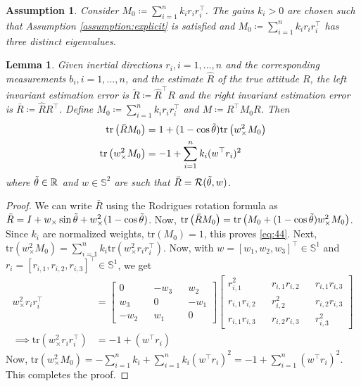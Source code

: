 \documentclass{article}
\newcommand{\R}[1]{\mathbb{R}^{#1}}
\newtheorem{assumption}{Assumption}
\newtheorem{lemma}{Lemma}
\newcommand{\trace}[1]{\text{tr}\left(#1\right)}
\newcommand{\Rtilde}{\tilde{R}}
\begin{document}
\begin{assumption}\label{assumption:distinctEigOfM0}
    Consider $M_0 \coloneqq \sum_{i=1}^n k_ir_ir_i^\top $. The gains $k_i > 0$ are chosen such that Assumption \ref{assumption:explicit} is satisfied and $M_0\coloneqq \sum_{i=1}^n k_ir_ir_i^\top $ has three distinct eigenvalues. 
\end{assumption}

\begin{lemma}\label{lemma:5}
    Given inertial directions $r_i, i=1,...,n$ and the corresponding measurements $b_i, i=1,...,n$, and the estimate $\hat{R}$ of the true attitude $R$, the left invariant estimation error is $\Rtilde\coloneqq \hat{R}^\top R$ and the right invariant estimation error is $\bar{R}\coloneqq \hat{R}R^\top $. Define $M_0 \coloneqq \sum_{i=1}^n k_i r_ir_i^\top $ and $M \coloneqq R^\top M_0R$. Then
    \begin{align}
        \trace{\bar{R}M_0} &= 1 + (1-\cos\Tilde{\theta})\trace{w_\times^2M_0}\label{eq:44}\\
        \trace{w_\times^2 M_0} &= -1 + \sum_{i=1}^n k_i (w^\top r_i)^2 \label{eq:45}
    \end{align}
    where $\Tilde{\theta}\in\R{}$ and $w\in\mathbb{S}^2$ are such that $\bar{R} = \mathcal{R}(\Tilde{\theta}, w)$. 
\end{lemma}
\begin{proof}
    We can write $\bar{R}$ using the Rodrigues rotation formula as $\bar{R} = I + w_\times\sin\Tilde{\theta} + w^2_\times (1 - \cos\Tilde{\theta})$. Now, $\trace{\bar{R}M_0} = \trace{M_0 + (1-\cos\Tilde{\theta})w^2_\times M_0}$. Since $k_i$ are normalized weights, $\trace{M_0}=1$, this proves \eqref{eq:44}. 
    Next, $\text{tr}(w_\times^2M_0) = \sum_{i=1}^n k_i \trace{w_\times^2r_ir_i^\top }$. Now, with $w = [w_1, w_2, w_3]^\top \in\mathbb{S}^1$ and $r_i =[r_{i,1}, r_{i,2}, r_{i,3}]^\top  \in\mathbb{S}^1$, we get
    \begin{align*}
        w_\times^2r_ir_i^\top  &= \begin{bmatrix}
            0 && -w_3 && w_2\\
            w_3 && 0 && -w_1\\
            -w_2 && w_1 && 0
        \end{bmatrix}\begin{bmatrix}
            r_{i,1}^2 && r_{i,1}r_{i,2} && r_{i,1}r_{i,3}\\
            r_{i,1}r_{i,2} && r_{i,2}^2 && r_{i,2}r_{i,3}\\
            r_{i,1}r_{i,3} && r_{i,2}r_{i,3} && r_{i,3}^2
        \end{bmatrix}\\
        \implies \trace{w_\times^2r_ir_i^\top } &= -1 + (w^\top r_i)
    \end{align*}
    Now, $\trace{w_\times^2M_0} = -\sum_{i=1}^n k_i + \sum_{i=1}^nk_i(w^\top r_i)^2 = -1 + \sum_{i=1}^n(w^\top r_i)^2$. This completes the proof. 
\end{proof}
\end{document}
